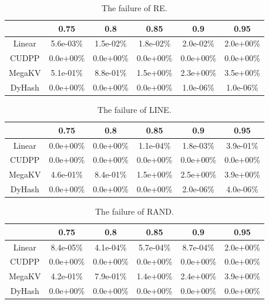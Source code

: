 \begin{table}[H]
	\caption{The failure of RE.}
	\centering
    \begin{tabular}{|c|c|c|c|c|c|}
		\hline
		           & 0.75 & 0.8 & 0.85 & 0.9 & 0.95\\ \hline
		Linear &5.6e-03\% & 1.5e-02\% &1.8e-02\%  & 2.0e-02\% & 2.0e+00\% \\ \hline
		CUDPP & 0.0e+00\% & 0.0e+00\% &0.0e+00\%  & 0.0e+00\% & 0.0e+00\% \\ \hline
		MegaKV &5.1e-01\% & 8.8e-01\% &1.5e+00\%  & 2.3e+00\% & 3.5e+00\% \\ \hline
		DyHash &0.0e+00\% & 0.0e+00\% &0.0e+00\%  & 1.0e-06\% & 1.0e-06\% \\ \hline
	\end{tabular}
	\label{tab:fail:re}
\end{table}

\begin{table}[H]
	\caption{The failure of LINE.}
	\centering
	\begin{tabular}{|c|c|c|c|c|c|}
		\hline
		           & 0.75 & 0.8 & 0.85 & 0.9 & 0.95\\ \hline
		Linear &0.0e+00\% & 0.0e+00\% &1.1e-04\%  & 1.8e-03\% & 3.9e-01\% \\ \hline
		CUDPP & 0.0e+00\% & 0.0e+00\% &0.0e+00\%  & 0.0e+00\% & 0.0e+00\% \\ \hline
		MegaKV &4.6e-01\% & 8.4e-01\% &1.5e+00\%  & 2.5e+00\% & 3.9e+00\% \\ \hline
		DyHash &0.0e+00\% & 0.0e+00\% &0.0e+00\%  & 2.0e-06\% & 4.0e-06\% \\ \hline
	\end{tabular}
	\label{tab:fail:line}
\end{table}

\begin{table}[H]
	\caption{The failure of RAND.}
	\centering
	\begin{tabular}{|c|c|c|c|c|c|}
		\hline
		           & 0.75 & 0.8 & 0.85 & 0.9 & 0.95\\ \hline
		Linear &8.4e-05\% & 4.1e-04\% &5.7e-04\%  & 8.7e-04\% & 2.0e+00\% \\ \hline
		CUDPP & 0.0e+00\% & 0.0e+00\% &0.0e+00\%  & 0.0e+00\% & 0.0e+00\% \\ \hline
		MegaKV &4.2e-01\% & 7.9e-01\% &1.4e+00\%  & 2.4e+00\% & 3.9e+00\% \\ \hline
		DyHash &0.0e+00\% & 0.0e+00\% &0.0e+00\%  & 0.0e+00\% & 0.0e+00\% \\ \hline
	\end{tabular}
	\label{tab:fail:rand}
\end{table}

